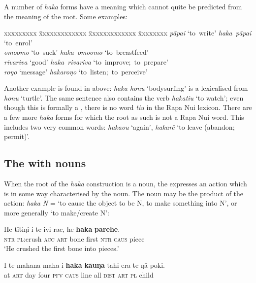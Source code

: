 A number of \textit{haka} forms have a meaning which cannot quite be predicted from the meaning of the root. Some examples:

\ea
\begin{tabbing}
xxxxxxxxx \= xxxxxxxxxxxxx \= xxxxxxxxxxxxx \= xxxxxxxx \kill
\textit{pāpa{\ꞌ}i} \>  ‘to~write’ \>  \textit{haka~pāpa{\ꞌ}i} \>  ‘to~enrol’\\
\textit{{\ꞌ}omo{\ꞌ}omo} \>  ‘to~suck’ \>  \textit{haka~{\ꞌ}omo{\ꞌ}omo} \>  ‘to~breastfeed’\\
\textit{rivariva} \>  ‘good’ \>  \textit{haka~rivariva} \>  ‘to~improve;~to~prepare’\\
\textit{roŋo} \>  ‘message’ \>  \textit{hakaroŋo} \>  ‘to~listen;~to~perceive’
\end{tabbing}
\z

Another example is found in  above: \textit{haka honu} ‘bodysurfing’ is a lexicalised  from \textit{honu} ‘turtle’. The same sentence also contains the verb \textit{hakatiu} ‘to watch’; even though this is formally a , there is no word \textit{tiu} in the Rapa Nui lexicon. There are a few more \textit{haka} forms for which the root as such is not a Rapa Nui word. This includes two very common words: \textit{\mbox{haka{\ꞌ}ou}} ‘again’, \textit{hakarē} ‘to leave (abandon; permit)’. 

\subsection{The   with nouns}\label{sec:8.12.6}

When the root of the \textit{haka} construction is a noun, the  expresses an action which is in some way characterised by the noun. The noun may be the product of the action: \textit{haka N} = ‘to cause the object to be N, to make something into N’, or more generally ‘to make/create N’:

\ea\label{ex:8.251}
\gll He tītiŋi i te ivi ra{\ꞌ}e, he \textbf{haka} \textbf{parehe}.\\
\textsc{ntr} \textsc{pl}:crush \textsc{acc} \textsc{art} bone first \textsc{ntr} \textsc{caus} piece\\

\glt 
‘He crushed the first bone into pieces.’ \textstyleExampleref{[Mtx-3-01.199]}
\z

\ea\label{ex:8.252}
\gll {\ꞌ}I te mahana maha i \textbf{haka} \textbf{kāuŋa} tahi era te ŋā poki. \\
at \textsc{art} day four \textsc{pfv} \textsc{caus} line all \textsc{dist} \textsc{art} \textsc{pl} child \\

